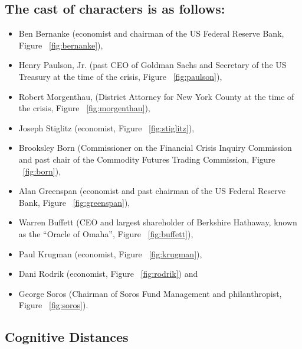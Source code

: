 \documentclass[12pt]{article}
\begin{document}
\subsection*{The cast of characters is as follows:}
\begin{itemize}
\item Ben Bernanke (economist and chairman of the US Federal Reserve Bank, Figure ~\ref{fig:bernanke}),
\item Henry Paulson, Jr. (past CEO of Goldman Sachs and Secretary of the US Treasury at the time of the crisis, Figure ~\ref{fig:paulson}),
\item Robert Morgenthau, (District Attorney for New York County at the time of the crisis, Figure ~\ref{fig:morgenthau}),
\item Joseph Stiglitz (economist, Figure ~\ref{fig:stiglitz}),
\item Brooksley Born (Commissioner on the Financial Crisis Inquiry Commission and past chair of the Commodity Futures Trading Commission, Figure ~\ref{fig:born}),
\item Alan Greenspan (economist and past chairman of the US Federal Reserve Bank, Figure ~\ref{fig:greenspan}),
\item Warren Buffett (CEO and largest shareholder of Berkshire Hathaway, known as the ``Oracle of Omaha'', Figure ~\ref{fig:buffett}),
\item Paul Krugman (economist, Figure ~\ref{fig:krugman}),
\item Dani Rodrik (economist, Figure ~\ref{fig:rodrik})
and
\item George Soros (Chairman of Soros Fund Management and philanthropist, Figure ~\ref{fig:soros}).
\end{itemize}

\subsection*{Cognitive Distances}
\end{document}
